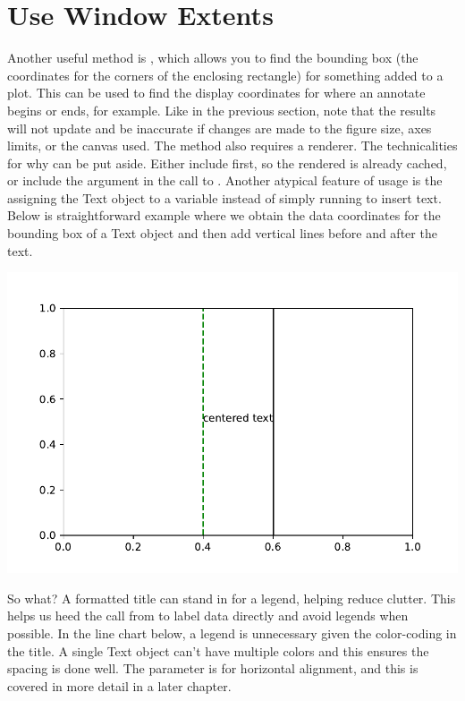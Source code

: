 

\section{Use Window Extents}

Another useful method is , which allows you to find the bounding box (the coordinates for the corners of the enclosing rectangle) for something added to a plot. This can be used to find the display coordinates for where an annotate begins or ends, for example. Like in the previous section, note that the results will not update and be inaccurate if changes are made to the figure size, axes limits, or the canvas used. The method also requires a renderer. The technicalities for why can be put aside. Either include  first, so the rendered is already cached, or include the argument  in the call to . Another atypical feature of  usage is the assigning the Text object to a variable  instead of simply running  to insert text. Below is straightforward example where we obtain the data coordinates for the bounding box of a Text object and then add vertical lines before and after the text.



\begin{center}
    \includegraphics[width = .7\textwidth]{figures/proseplots/window-extent.pdf}
\end{center}

So what? A formatted title can stand in for a legend, helping reduce clutter. This helps us heed the call from \cite{schwabish2021better} to label data directly and avoid legends when possible. In the line chart below, a legend is unnecessary given the color-coding in the title. A single Text object can't have multiple colors and this ensures the spacing is done well. The  parameter is for horizontal alignment, and this is covered in more detail in a later chapter. %


